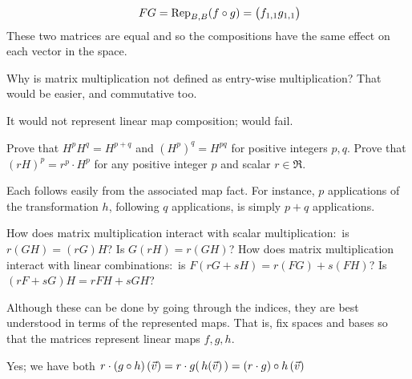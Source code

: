 \begin{exercises}
\begin{answer}
\begin{equation*}
        \qquad
        FG=\rep{\composed{f}{g}}{B,B}=\begin{pmatrix}
                        f_{1,1}g_{1,1}
                     \end{pmatrix}
      \end{equation*}
      These two matrices are equal and so the compositions have the same
      effect on each vector in the space.
     \end{answer}
  \item  
    Why is matrix multiplication not defined as entry-wise multiplication?
    That would be easier, and commutative too.
    \begin{answer}
      It would not represent linear map composition; 
       would fail.  
    \end{answer}
  \recommended \item \label{exer:NicePropsMatMult} 
    \begin{exparts}
      \partsitem Prove that $H^pH^q=H^{p+q}$ and $(H^p)^q=H^{pq}$ 
        for positive integers \( p,q \).
      \partsitem Prove that $(rH)^p=r^p\cdot H^p$ 
        for any positive integer \( p \) and scalar \( r\in\Re \).
    \end{exparts}
    \begin{answer}
      Each follows easily from the associated map fact.
      For instance, $p$ applications of the transformation $h$, following $q$
      applications, is simply $p+q$ applications.
    \end{answer}
  \recommended \item \label{exer:MoreNicePropsMatMult} 
    \begin{exparts}
      \partsitem How does matrix multiplication interact with 
        scalar multiplication:~is \( r(GH)=(rG)H \)?
        Is \( G(rH)=r(GH) \)?
      \partsitem  How does matrix multiplication interact with 
        linear combinations:~is \( F(rG+sH)=r(FG)+s(FH) \)?
        Is $(rF+sG)H=rFH+sGH$?
    \end{exparts}
    \begin{answer}  
      Although these can be done by going through the indices, they
      are best understood in terms of the represented maps.
      That is, fix spaces and bases so that the matrices 
      represent linear maps $f,g,h$.
       \begin{exparts}
        \partsitem Yes;  we have both 
          $r\cdot (\composed{g}{h})\,(\vec{v})
           =r\cdot g(\,h(\vec{v})\,)
           =\composed{(r\cdot g)}{h}\,(\vec{v})$

\end{exparts}
\end{answer}
\end{exercises}
